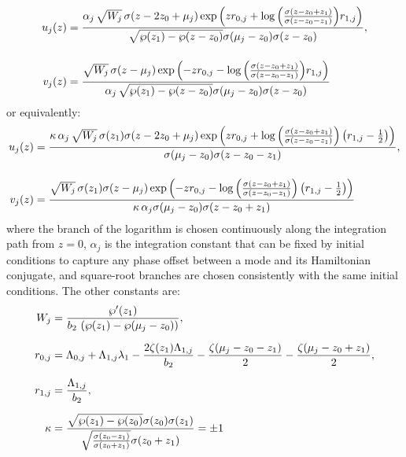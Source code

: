 \documentclass[11pt,a4paper]{article}
\numberwithin{equation}{section}
\begin{document}
\begin{align}
u_j{\left(z\right)} &= \frac{\alpha_j\,\sqrt{W_j} \,\sigma{\left(z - 2 z_{0} + {\mu}_{j} \right)} \exp\left(z {r}_{0,j} + \log{\left(\frac{\sigma{\left(z - z_{0} + z_{1} \right)}}{\sigma{\left(z - z_{0} - z_{1} \right)}} \right)} {r}_{1,j}\right)}{\sqrt{\wp{\left(z_{1} \right)} - \wp{\left(z - z_{0} \right)}} \sigma{\left({\mu}_{j} - z_{0}\right)} \sigma{\left(z - z_{0} \right)}}, \notag \\[12pt]
v_j{\left(z\right)} &= \frac{\sqrt{W_j} \,\sigma{\left(z - {\mu}_{j} \right)} \exp\left(- z {r}_{0,j} - \log{\left(\frac{\sigma{\left(z - z_{0} + z_{1} \right)}}{\sigma{\left(z - z_{0} - z_{1} \right)}} \right)} {r}_{1,j} \right)}{\alpha_j\,\sqrt{\wp{\left(z_{1} \right)} - \wp{\left(z - z_{0} \right)}} \sigma{\left({\mu}_{j} - z_{0}\right)} \sigma{\left(z - z_{0}\right)}} \label{eq:u-v-quartic}
\end{align}
or equivalently:
\begin{align}
u_j{\left(z\right)} &= \frac{\kappa\, \alpha_j\,\sqrt{W_j} \,\sigma{\left(z_1\right)}\sigma{\left(z - 2 z_{0} + {\mu}_{j} \right)} \exp\left(z {r}_{0,j} + \log{\left(\frac{\sigma{\left(z - z_{0} + z_{1} \right)}}{\sigma{\left(z - z_{0} - z_{1} \right)}} \right)} \left({r}_{1,j} - \frac{1}{2}\right)\right)}{ \sigma{\left({\mu}_{j} - z_{0}\right)} \sigma{\left(z - z_{0}  - z_1\right)}}, \notag \\[12pt]
v_j{\left(z\right)} &= \frac{\sqrt{W_j} \,  \sigma{\left(z_1\right)}\sigma{\left(z - {\mu}_{j} \right)} \exp\left(- z {r}_{0,j} - \log{\left(\frac{\sigma{\left(z - z_{0} + z_{1} \right)}}{\sigma{\left(z - z_{0} - z_{1} \right)}} \right)}  \left({r}_{1,j} - \frac{1}{2}\right) \right)}{\kappa \,\alpha_j \sigma{\left({\mu}_{j} - z_{0}\right)} \sigma{\left(z - z_{0} + z_1\right)}} \label{eq:u-v-quartic-no-wp-sqrt}
\end{align}
where the branch of the logarithm is chosen continuously along the integration path from $z=0$, $\alpha_j$ is the integration constant that can be fixed by initial conditions to capture any phase offset between a mode and its Hamiltonian conjugate, and square-root branches are chosen consistently with the same initial conditions.
The other constants are:
\begin{align}
W_j &= \frac{\wp'{\left(z_{1} \right)}}{b_2\,\left(\wp{\left(z_{1} \right)} - \wp{\left({\mu}_{j} - z_{0}\right)}\right)}, \notag \\[6pt]
r_{0,j} &= {\Lambda}_{0,j} + {\Lambda}_{1,j} {\lambda}_{1} - \frac{2 \zeta{\left(z_{1} \right)} {\Lambda}_{1,j}}{b_2} - \frac{\zeta{\left({\mu}_{j} - z_{0} - z_{1}\right)}}{2} - \frac{\zeta{\left({\mu}_{j} - z_{0} + z_{1}\right)}}{2}, \notag \\[6pt]
r_{1,j} &= \frac{{\Lambda}_{1,j}}{b_2}, \notag \\[6pt]
\kappa &= \frac{\sqrt{\wp{\left(z_{1}\right)} - \wp{\left(z_{0}\right)}} \sigma{\left(z_{0}\right)} \sigma{\left(z_{1}\right)}}{\sqrt{\frac{\sigma{\left(z_{0} - z_{1}\right)}}{\sigma{\left(z_{0} + z_{1}\right)}}} \sigma{\left(z_{0} + z_{1}\right)}} = \pm 1
\end{align}
\end{document}
